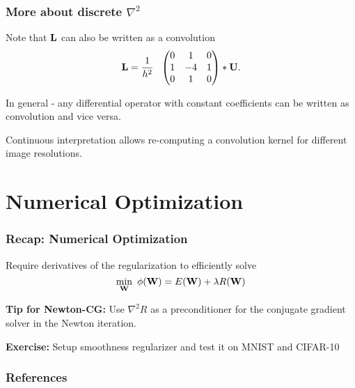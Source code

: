 \documentclass[12pt,fleqn,handout]{beamer}
\begin{document}
\begin{frame}[fragile]\frametitle{More about discrete $\nabla^2$}

Note that ${\bf L}$ can also be written as a convolution
$$ \bfL = {\frac 1 {h^2}}\ \  \begin{pmatrix} 0  &  1  &  0 \\ 1  & -4  & 1 \\ 0  & 1  & 0 \end{pmatrix} * \bfU. $$

In general - any differential operator with constant coefficients can be written
as convolution and vice versa.

\bigskip

Continuous interpretation allows re-computing a convolution kernel for different image resolutions.


\end{frame}

\section{Numerical Optimization} %
\label{sec:numerical_optimization}
\begin{frame}[fragile]\frametitle{Recap: Numerical Optimization}

Require derivatives of the regularization to efficiently solve
$$ \min_{{\bf W}} \ \phi({\bf W}) = E({\bf W}) + \lambda R({\bf W}) $$


\bigskip
\pause

{\bf Tip for Newton-CG:} Use $\nabla^2 R$ as a preconditioner for the conjugate gradient
solver in the Newton iteration. 

\bigskip
\pause
\textbf{Exercise:} Setup smoothness regularizer and test it on MNIST and CIFAR-10
\end{frame}



\begin{frame}[allowframebreaks]
	\frametitle{References}



\end{frame}
\end{document}
